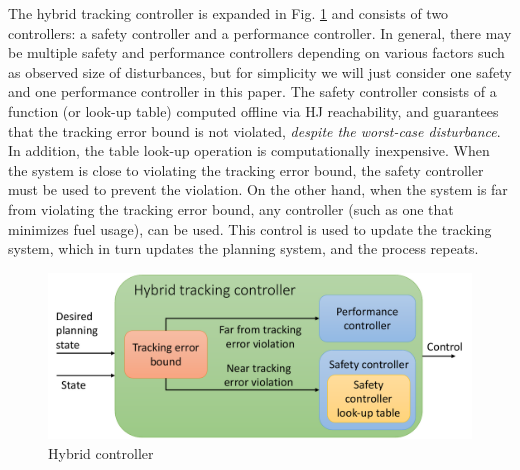 The hybrid tracking controller is expanded in Fig. \ref{fig:hybrid_ctrl} and consists of two controllers: a safety controller and a performance controller. In general, there may be multiple safety and performance controllers depending on various factors such as observed size of disturbances, but for simplicity we will just consider one safety and one performance controller in this paper. The safety controller consists of a function (or look-up table) computed offline via HJ reachability, and guarantees that the tracking error bound is not violated, \textit{despite the worst-case disturbance}. In addition, the table look-up operation is computationally inexpensive. When the system is close to violating the tracking error bound, the safety controller must be used to prevent the violation. On the other hand, when the system is far from violating the tracking error bound, any controller (such as one that minimizes fuel usage), can be used. This control is used to update the tracking system, which in turn updates the planning system, and the process repeats.
\begin{figure}[h!]
  \centering
	\includegraphics[width=0.95\columnwidth]{fig/hybrid_controller}
	\caption{Hybrid controller}
	\label{fig:hybrid_ctrl}
	\vspace{-.1in}
\end{figure}

